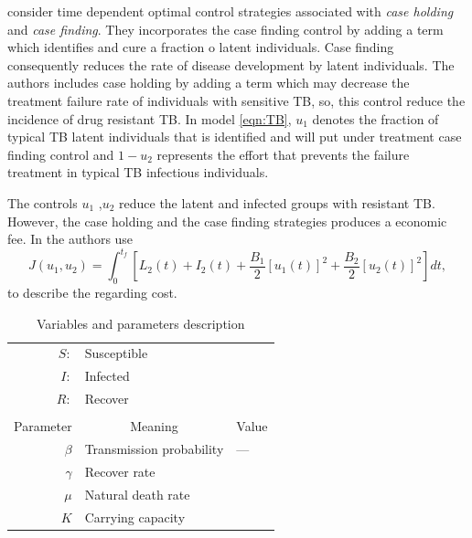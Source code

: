 	\citeauthor*{Lenhart2002} consider time dependent 
optimal control strategies associated with \emph{case holding} and 
\emph{case finding}. They 
incorporates the case finding control by adding a term which identifies and 
cure a fraction o latent individuals. Case finding consequently reduces the 
rate of disease development by latent individuals. The authors includes case 
holding by adding a term which may decrease the treatment failure rate of 
individuals with sensitive  TB, so, this control reduce the incidence of drug 
resistant TB. In model \eqref{eqn:TB}, $u_1$ denotes the fraction of 
typical TB latent individuals that is identified and will put under 
treatment \textemdash case finding control \textemdash and $1 - u_2$ represents 
the effort that prevents the failure treatment in typical TB infectious 
individuals.

	The controls $u_1$ ,$u_2$ reduce the latent and infected 
groups with resistant TB. However, the case holding and the case finding 
strategies produces a economic fee. In \cite{Lenhart2002} the authors use
\begin{equation}
	 J(u_1, u_2) =
		 \int_0 ^ {t_f}
			 \left[
				 L_2(t) + I_2(t) 
				 + \frac{B_1}{2} [u_1(t)] ^ 2
				 + \frac{B_2}{2} [u_2(t)] ^ 2
			 \right]dt,
\end{equation}
to describe the regarding cost.
\begin{table}
	\begin{center}
		\begin{tabular}{@{}rll@{}} 
			$S:$
			&
				Susceptible
			\\
			$I:$ 
			&	Infected
			\\
			$R:$ 
			&	Recover
			\\
			\\
			\multicolumn{1}{c}{Parameter}
			&
			\multicolumn{1}{c}{Meaning}
			& 
			\multicolumn{1}{c}{Value}
			\\
				\midrule
				$\beta$
				& 
					Transmission probability
				&
					---
			\\
				$\gamma$
				&
					Recover rate
			\\
				$\mu$
				&
					Natural death rate
			\\
				$K$
				&
					Carrying capacity
			\\
			\bottomrule
		\end{tabular}
		\caption{Variables and parameters description}
	\end{center}
\end{table}

